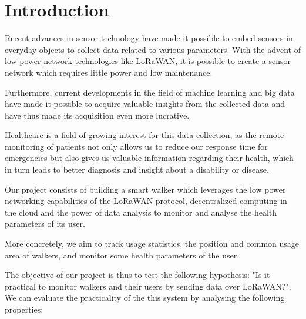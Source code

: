 \chapter{Introduction}
\label{cha:introduction}

Recent advances in sensor technology have made it possible to embed sensors in everyday objects to collect data related to various parameters. With the advent of low power network technologies like LoRaWAN, it is possible to create a sensor network which requires little power and low maintenance.

Furthermore, current developments in the field of machine learning and big data have made it possible to acquire valuable insights from the collected data and have thus made its acquisition even more lucrative.

Healthcare is a field of growing interest for this data collection, as the remote monitoring of patients not only allows us to reduce our response time for emergencies but also gives us valuable information regarding their health, which in turn leads to better diagnosis and insight about a disability or disease.

Our project consists of building a smart walker which leverages the low power networking capabilities of the LoRaWAN protocol, decentralized computing in the cloud and the power of data analysis to monitor and analyse the health parameters of its user.

More concretely, we aim to track usage statistics, the position and common usage area of walkers, and monitor some health parameters of the user.

The objective of our project is thus to test the following hypothesis:
"Is it practical to monitor walkers and their users by sending data over LoRaWAN?". We can evaluate the practicality of the this system by analysing the following properties:

